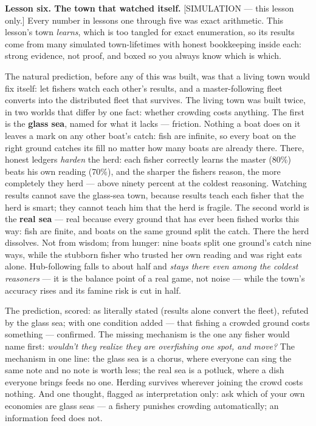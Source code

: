 \begin{panelplain}

\textbf{Lesson six. The town that watched itself.} {\sffamily\fontsize{8.6}{12.2}\selectfont\color{trackc}[SIMULATION — this lesson only.]} Every number in lessons one through five was exact
arithmetic. This lesson's town \emph{learns}, which is too tangled for
exact enumeration, so its results come from many simulated
town-lifetimes with honest bookkeeping inside each: strong evidence,
not proof, and boxed so you always know which is which.

The natural prediction, before any of this was built, was that a
living town would fix itself: let fishers watch each other's
results, and a master-following fleet converts into the distributed
fleet that survives. The living town was built twice, in two worlds
that differ by one fact: whether crowding costs anything. The first
is the \textbf{glass sea}, named for what it lacks --- friction. Nothing a
boat does on it leaves a mark on any other boat's catch: fish are
infinite, so every boat on the right ground catches its fill no
matter how many boats are already there. There, honest
ledgers \emph{harden} the herd: each fisher correctly learns the master
(80\%) beats his own reading (70\%), and the sharper the fishers
reason, the more completely they herd --- above ninety percent at the
coldest reasoning. Watching results cannot save the glass-sea town,
because results teach each fisher that the herd is smart; they
cannot teach him that the herd is fragile. The second world is the
\textbf{real sea} --- real because every ground that has ever been fished
works this way: fish are finite, and boats on the same ground split
the catch. There the herd dissolves. Not from wisdom; from hunger: nine boats split one
ground's catch nine ways, while the stubborn fisher who trusted her
own reading and was right eats alone. Hub-following falls to about
half and \emph{stays there even among the coldest reasoners} --- it is the
balance point of a real game, not noise --- while the town's accuracy
rises and its famine risk is cut in half.

The prediction, scored: as literally stated (results alone convert
the fleet), refuted by the glass sea; with one condition added --- that
fishing a crowded ground costs something --- confirmed. The missing
mechanism is the one any fisher would name first: \emph{wouldn't they
realize they are overfishing one spot, and move?} The mechanism in
one line: the glass sea is a chorus, where everyone can sing the
same note and no note is worth less; the real sea is a potluck,
where a dish everyone brings feeds no one. Herding survives wherever
joining the crowd costs nothing. And one thought, flagged as
interpretation only: ask which of your own economies are glass seas
--- a fishery punishes crowding automatically; an information feed
does not.

\end{panelplain}

